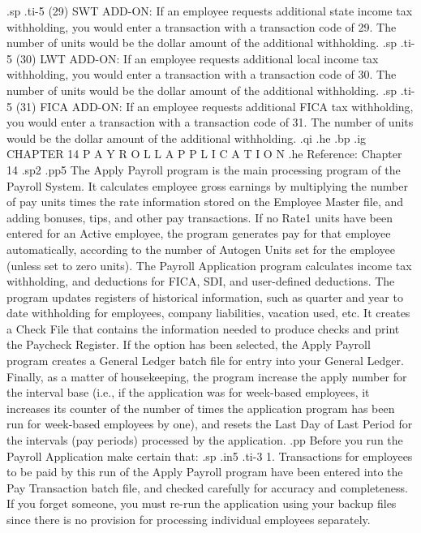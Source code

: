 .sp
.ti-5
(29) SWT ADD-ON: If an employee requests additional state income tax
withholding,
you would enter a transaction with a transaction code of 29.  The number
of units would be the dollar amount of the additional withholding.
.sp
.ti-5
(30) LWT ADD-ON: If an employee requests additional local income tax
withholding,
you would enter a transaction with a transaction code of 30.  The number
of units would be the dollar amount of the additional withholding.
.sp
.ti-5
(31) FICA ADD-ON: If an employee requests additional FICA tax withholding,
you would enter a transaction with a transaction code of 31.  The number
of units would be the dollar amount of the additional withholding.
.qi
.he
.bp
.ig
CHAPTER 14
P A Y R O L L	 A P P L I C A T I O N
.he Reference: Chapter 14
.sp2
.pp5
The Apply Payroll program is the main processing program of
the Payroll System.  It calculates employee gross earnings by
multiplying the number of pay units
times the rate information stored on
the Employee Master file, and adding bonuses, tips, and other pay
transactions.  If no Rate1 units have been entered for an Active
employee, the program generates pay for that employee automatically,
according to the number of Autogen Units set for the employee (unless
set to zero units).  The Payroll Application program calculates income
tax withholding, and deductions for FICA, SDI, and
user-defined deductions.  The program updates registers of
historical information, such as quarter and year to date withholding
for employees, company liabilities, vacation used, etc.  It
creates a Check File that contains the information needed to produce
checks and print the Paycheck Register.  If the option has been selected,
the Apply Payroll program creates a General Ledger batch file for
entry into your General Ledger.  Finally, as a matter of housekeeping,
the program increase the apply number for the interval base (i.e.,
if the application was for week-based employees, it increases its counter
of the number of times the application program has been run for week-based
employees by one), and resets the Last Day of Last Period for the
intervals (pay periods) processed by the application.
.pp
Before you run the Payroll Application make certain that:
.sp
.in5
.ti-3
1. Transactions for employees to be paid by this run of
the Apply Payroll program have been entered into the
Pay Transaction batch file, and checked carefully
for accuracy and completeness.
If you forget someone, you must re-run the application using your
backup files since there is no provision for processing individual
employees separately.
